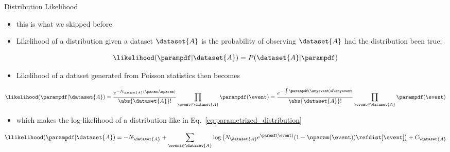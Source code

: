 \documentclass[notheorems]{beamer}
\begin{document}
\begin{frame}{Distribution Likelihood}
    \begin{itemize}
        \item this is what we skipped before
        \item Likelihood of a distribution given a dataset $\dataset{A}$ is the probability of observing $\dataset{A}$ had the distribution been true:
    \end{itemize}
    \begin{equation}
        \likelihood(\parampdf | \dataset{A}) = P(\dataset{A} | \parampdf)
    \end{equation}
    \begin{itemize}
        \item Likelihood of a dataset generated from Poisson statistics then becomes
    \end{itemize}
    \begin{equation}
    \label{eq:poisson-likelihood}
        \likelihood(\parampdf | \dataset{A})
        = \dfrac{e^{-N_{\dataset{A}}(\param, \nparam)}}{\abs{\dataset{A}}!}
        \prod\limits_{\event \in \dataset{A}} \parampdf(\event)
        = \dfrac{e^{-\int \parampdf(\anyevent) d\anyevent}}{\abs{\dataset{A}}!}
        \prod\limits_{\event \in \dataset{A}} \parampdf(\event)
    \end{equation}
    \begin{itemize}
        \item which makes the log-likelihood of a distribution like in Eq.~\ref{eq:parametrized_distribution}
    \end{itemize}
    \begin{equation}
    \label{eq:poisson-log-likelihood}
        \llikelihood( \parampdf | \dataset{A}) = -N_{\dataset{A}} + \sum_{\event \in \dataset{A}} \log\big({N}_{\dataset{A}} e^{\paramf(\event)} (1 + \nparam(\event)) \refdist[\event]\big) + C_\dataset{A}
    \end{equation}
\end{frame}
\end{document}
